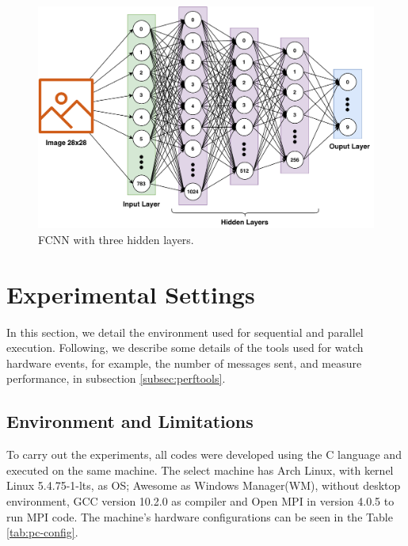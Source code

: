 \documentclass[conference]{IEEEtran}
\begin{document}
\begin{figure}
    \centering
    \includegraphics[width=\columnwidth]{images/FCNN-P2.pdf}
    \caption{FCNN with three hidden layers.}
    \label{fig:arqp2}
\end{figure}

\section{Experimental Settings}\label{sec:settings}

In this section, we detail the environment used for sequential and parallel execution. Following, we describe some details of the tools used for watch hardware events, for example, the number of messages sent, and measure performance, in subsection \ref{subsec:perftools}.

\subsection{Environment and Limitations}\label{subsec:env}

To carry out the experiments, all codes were developed using the C language and executed on the same machine. The select machine has Arch Linux, with kernel Linux 5.4.75-1-lts, as OS; Awesome as Windows Manager(WM), without desktop environment, GCC version 10.2.0 as compiler and Open MPI in version 4.0.5 to run MPI code. The machine's hardware configurations can be seen in the Table \ref{tab:pc-config}.
\end{document}
